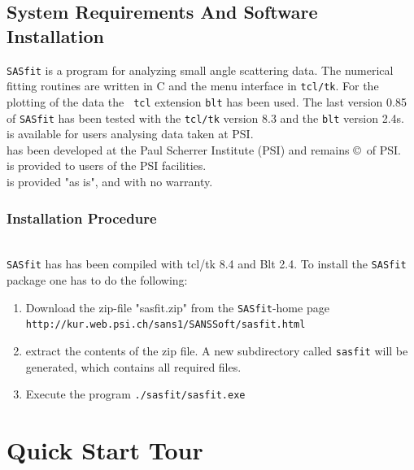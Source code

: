 \section{System Requirements And Software Installation}
{\tt SASfit} is a program for analyzing small angle scattering data.
The numerical fitting routines are written in C and the menu
interface in {\tt tcl/tk}. For the plotting of the data the {\tt
tcl} extension {\tt blt} has been used. The last version 0.85 of
{\tt SASfit} has been tested with the {\tt tcl/tk} version 8.3 and
the {\tt blt} version 2.4s. \\

\noindent
\SASfit is available for users analysing data taken at PSI. \\
\SASfit has been developed at the Paul Scherrer Institute (PSI) and remains \copyright\ of PSI. \\
\SASfit is provided to users of the PSI facilities.\\
\SASfit is provided "as is", and with no warranty. \\

\subsection{Installation Procedure} ~\\

\verb"SASfit" has has been compiled with tcl/tk 8.4 and Blt 2.4. To
install the \texttt{SASfit} package one has to do the following:
\begin{enumerate}
\item Download the zip-file "sasfit.zip" from the \texttt{SASfit}-home page\\
\verb"http://kur.web.psi.ch/sans1/SANSSoft/sasfit.html"
\item extract the contents of the zip file. A new subdirectory called \verb"sasfit" will be generated, which contains all required files.
\item Execute the program  \texttt{./sasfit/sasfit.exe}
\end{enumerate}

\chapter{Quick Start Tour}

